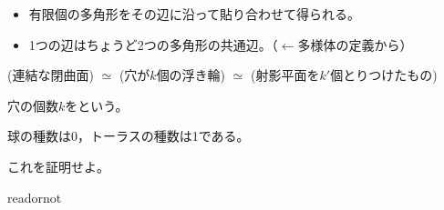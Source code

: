 \documentclass[uplatex]{jsarticle}
\begin{document}
\begin{itemize}
  \vspace{-0.5\baselineskip}
  \item 有限個の多角形をその辺に沿って貼り合わせて得られる。
  \item 1つの辺はちょうど2つの多角形の共通辺。（$\leftarrow$多様体の定義から）
\end{itemize}

\begin{rei}
\end{rei}

\sukima {}

(連結な閉曲面) $\simeq$ (穴が$k$個の浮き輪) $\simeq$ (射影平面を$k'$個とりつけたもの)

穴の個数$k$をという。

\begin{rei}[種数]
  球の種数は0，トーラスの種数は1である。
\end{rei}

これを証明せよ。

\expandafter\ifx\csname readornot\endcsname\relax
  
\end{document}

